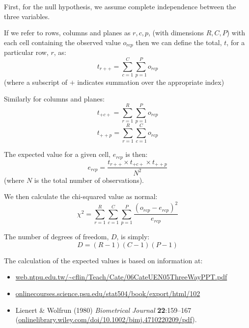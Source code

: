 \documentclass[12pt,a4paper]{article}
\begin{document}
First, for the null hypothesis, we assume complete independence
between the three variables.

If we refer to rows, columns and planes as $r,c,p$, (with dimensions
$R,C,P$) with each cell containing the observed value $o_{rcp}$ then
we can define the total, $t$, for a particular row, $r$, as:
$$t_{r++} = \sum_{c=1}^{C}\sum_{p=1}^{P}o_{rcp}$$
\noindent(where a subscript of $+$ indicates summation over the
appropriate index)

Similarly for columns and planes:
$$t_{+c+} = \sum_{r=1}^{R}\sum_{p=1}^{P}o_{rcp}$$
$$t_{++p} = \sum_{r=1}^{R}\sum_{c=1}^{C}o_{rcp}$$

The expected value for a given cell, $e_{rcp}$ is then:
$$e_{rcp} = \frac{t_{r++} \times t_{+c+} \times t_{++p}}{N^2}$$
\noindent (where $N$ is the total number of observations).

We then calculate the chi-squared value as normal:
$$\chi^2 = \sum_{r=1}^{R}\sum_{c=1}^{C}\sum_{p=1}^{P}\frac{(o_{rcp} - e_{rcp})^2}{e_{rcp}}$$

The number of degrees of freedom, $D$, is simply:
$$D = (R-1)(C-1)(P-1)$$

The calculation of the expected values is based on information at:
\begin{itemize}
\item\url{web.ntpu.edu.tw/~cflin/Teach/Cate/06CateUEN05ThreeWayPPT.pdf}
\item\url{onlinecourses.science.psu.edu/stat504/book/export/html/102}
\item Lienert \& Wolfrun (1980) \emph{Biometrical Journal} {\bfseries
  22}:159--167
(\url{onlinelibrary.wiley.com/doi/10.1002/bimj.4710220209/pdf}).
\end{itemize}
\end{document}
